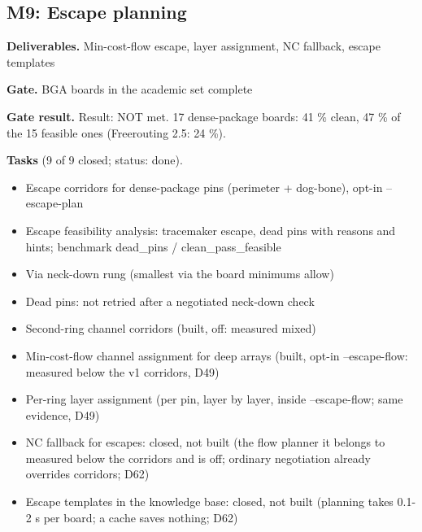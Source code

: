 \subsection*{M9: Escape planning}
\noindent\textbf{Deliverables.} Min-cost-flow escape, layer assignment, NC fallback, escape templates\par\smallskip
\noindent\textbf{Gate.} BGA boards in the academic set complete\par\smallskip
\noindent\colorbox{boxfill}{\parbox{\dimexpr\linewidth-2\fboxsep}{\textbf{Gate result.} Result: NOT met. 17 dense-package boards: 41 \% clean, 47 \% of the 15 feasible ones (Freerouting 2.5: 24 \%).}}\par\smallskip
\noindent\textbf{Tasks} (9 of 9 closed; status: done).
\begin{itemize}[leftmargin=1.6em,itemsep=1pt]
\item[\textcolor{fraqua}{$\checkmark$}] Escape corridors for dense-package pins (perimeter + dog-bone), opt-in --escape-plan
\item[\textcolor{fraqua}{$\checkmark$}] Escape feasibility analysis: tracemaker escape, dead pins with reasons and hints; benchmark dead\_pins / clean\_pass\_feasible
\item[\textcolor{fraqua}{$\checkmark$}] Via neck-down rung (smallest via the board minimums allow)
\item[\textcolor{fraqua}{$\checkmark$}] Dead pins: not retried after a negotiated neck-down check
\item[\textcolor{fraqua}{$\checkmark$}] Second-ring channel corridors (built, off: measured mixed)
\item[\textcolor{fraqua}{$\checkmark$}] Min-cost-flow channel assignment for deep arrays (built, opt-in --escape-flow: measured below the v1 corridors, D49)
\item[\textcolor{fraqua}{$\checkmark$}] Per-ring layer assignment (per pin, layer by layer, inside --escape-flow; same evidence, D49)
\item[\textcolor{fraqua}{$\checkmark$}] NC fallback for escapes: closed, not built (the flow planner it belongs to measured below the corridors and is off; ordinary negotiation already overrides corridors; D62)
\item[\textcolor{fraqua}{$\checkmark$}] Escape templates in the knowledge base: closed, not built (planning takes 0.1-2 s per board; a cache saves nothing; D62)
\end{itemize}

